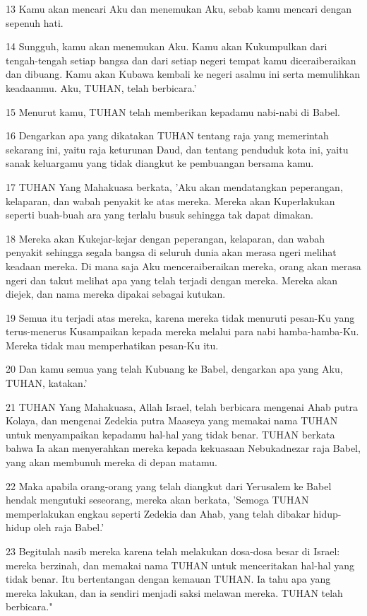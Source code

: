 \par 13 Kamu akan mencari Aku dan menemukan Aku, sebab kamu mencari dengan sepenuh hati.
\par 14 Sungguh, kamu akan menemukan Aku. Kamu akan Kukumpulkan dari tengah-tengah setiap bangsa dan dari setiap negeri tempat kamu diceraiberaikan dan dibuang. Kamu akan Kubawa kembali ke negeri asalmu ini serta memulihkan keadaanmu. Aku, TUHAN, telah berbicara.'
\par 15 Menurut kamu, TUHAN telah memberikan kepadamu nabi-nabi di Babel.
\par 16 Dengarkan apa yang dikatakan TUHAN tentang raja yang memerintah sekarang ini, yaitu raja keturunan Daud, dan tentang penduduk kota ini, yaitu sanak keluargamu yang tidak diangkut ke pembuangan bersama kamu.
\par 17 TUHAN Yang Mahakuasa berkata, 'Aku akan mendatangkan peperangan, kelaparan, dan wabah penyakit ke atas mereka. Mereka akan Kuperlakukan seperti buah-buah ara yang terlalu busuk sehingga tak dapat dimakan.
\par 18 Mereka akan Kukejar-kejar dengan peperangan, kelaparan, dan wabah penyakit sehingga segala bangsa di seluruh dunia akan merasa ngeri melihat keadaan mereka. Di mana saja Aku menceraiberaikan mereka, orang akan merasa ngeri dan takut melihat apa yang telah terjadi dengan mereka. Mereka akan diejek, dan nama mereka dipakai sebagai kutukan.
\par 19 Semua itu terjadi atas mereka, karena mereka tidak menuruti pesan-Ku yang terus-menerus Kusampaikan kepada mereka melalui para nabi hamba-hamba-Ku. Mereka tidak mau memperhatikan pesan-Ku itu.
\par 20 Dan kamu semua yang telah Kubuang ke Babel, dengarkan apa yang Aku, TUHAN, katakan.'
\par 21 TUHAN Yang Mahakuasa, Allah Israel, telah berbicara mengenai Ahab putra Kolaya, dan mengenai Zedekia putra Maaseya yang memakai nama TUHAN untuk menyampaikan kepadamu hal-hal yang tidak benar. TUHAN berkata bahwa Ia akan menyerahkan mereka kepada kekuasaan Nebukadnezar raja Babel, yang akan membunuh mereka di depan matamu.
\par 22 Maka apabila orang-orang yang telah diangkut dari Yerusalem ke Babel hendak mengutuki seseorang, mereka akan berkata, 'Semoga TUHAN memperlakukan engkau seperti Zedekia dan Ahab, yang telah dibakar hidup-hidup oleh raja Babel.'
\par 23 Begitulah nasib mereka karena telah melakukan dosa-dosa besar di Israel: mereka berzinah, dan memakai nama TUHAN untuk menceritakan hal-hal yang tidak benar. Itu bertentangan dengan kemauan TUHAN. Ia tahu apa yang mereka lakukan, dan ia sendiri menjadi saksi melawan mereka. TUHAN telah berbicara."
